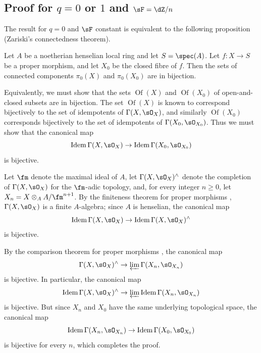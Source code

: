 \subsection{Proof for \texorpdfstring{$q=0$}{q=0} or \texorpdfstring{$1$}{1} and \texorpdfstring{$\sF=\dZ/n$}{\sF=Z/n}}\label{I:4-2}

The result for $q=0$ and $\sF$ constant is equivalent to the following
proposition (Zariski's connectedness theorem).

\begin{proposition}\label{I:4-2-1}
Let $A$ be a noetherian henselian local ring and let $S=\spec(A)$. Let
$f:X\to S$ be a proper morphism, and let $X_0$ be the closed fibre of
$f$. Then the sets of connected components $\pi_0(X)$ and
$\pi_0(X_0)$ are in bijection.
\end{proposition}

Equivalently, we must show that the sets $\operatorname{Of}(X)$ and
$\operatorname{Of}(X_0)$ of open-and-closed subsets are in bijection.
The set $\operatorname{Of}(X)$ is known to correspond bijectively to the
set of idempotents of $\Gamma(X,\sO_X)$, and similarly
$\operatorname{Of}(X_0)$ corresponds bijectively to the set of
idempotents of $\Gamma(X_0,\sO_{X_0})$. Thus we must show that the
canonical map
\[
  \operatorname{Idem} \Gamma(X,\sO_X) \to \operatorname{Idem}\Gamma(X_0,\sO_{X_0})
\]
is bijective.

Let $\fm$ denote the maximal ideal of $A$, let
$\Gamma(X,\sO_X)^\wedge$ denote the completion of $\Gamma(X,\sO_X)$
for the $\fm$-adic topology, and, for every integer $n\geqslant0$, let
$X_n=X\otimes_AA/\fm^{n+1}$. By the finiteness theorem for proper
morphisms \cite[III.3.2]{ega}, $\Gamma(X,\sO_X)$ is a finite
$A$-algebra; since $A$ is henselian, the canonical map
\[
  \operatorname{Idem} \Gamma(X,\sO_X) \to \operatorname{Idem}\Gamma(X,\sO_X)^\wedge
\]
is bijective.

By the comparison theorem for proper morphisms , the canonical map
\[ \Gamma(X,\sO_X)^\wedge \to \varprojlim \Gamma(X_n,\sO_{X_n}) \]
is bijective. In particular, the canonical map \[ \operatorname{Idem} \Gamma(X,\sO_X)^\wedge \to \varprojlim \operatorname{Idem}\Gamma(X_n,\sO_{X_n})
\]
is bijective. But since $X_n$ and $X_0$ have the same underlying
topological space, the canonical map
\[
  \operatorname{Idem}\Gamma(X_n,\sO_{X_n}) \to \operatorname{Idem} \Gamma(X_0,\sO_{X_0})
\]
is bijective for every $n$, which completes the proof.

